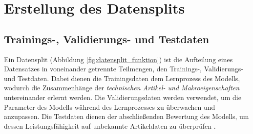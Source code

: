 
 

\section{Erstellung des Datensplits} 
\label{sec:erstellung_des_datensplits}
\subsection{Trainings-, Validierungs- und Testdaten}

Ein Datensplit (Abbildung \ref{fig:datensplit_funktion}) ist die Aufteilung eines Datensatzes in voneinander getrennte Teilmengen, den Trainings-, Validierungs- und Testdaten. 
Dabei dienen die Trainingsdaten dem Lernprozess des Modells, wodurch die Zusammenhänge der \textit{technischen Artikel- und Makroeigenschaften} untereinander erlernt werden. 
Die Validierungsdaten werden verwendet, um die Parameter des Modells während des Lernprozesses zu überwachen und anzupassen. 
Die Testdaten dienen der abschließenden Bewertung des Modells, um dessen Leistungsfähigkeit auf unbekannte Artikeldaten zu überprüfen \cite{kohavi1995cv,hastie2009elements}.

